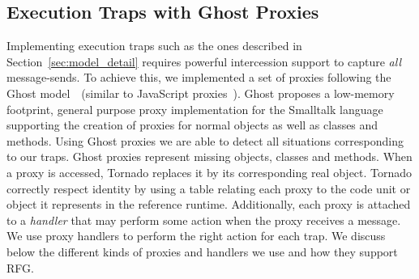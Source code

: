 \subsection{Execution Traps with Ghost Proxies} \label{sec:proxies}

Implementing execution traps such as the ones described in Section~\ref{sec:model_detail} requires powerful intercession support to capture \emph{all} message-sends.%
To achieve this, we implemented a set of proxies following the Ghost model~\cite{Mart11a}~(similar to JavaScript proxies~\cite{Vanc10a}). Ghost proposes a low-memory footprint, general purpose proxy implementation for the Smalltalk language supporting the creation of proxies for normal objects as well as classes and methods. 
Using Ghost proxies we are able to detect all situations corresponding to our traps.
Ghost proxies represent missing objects, classes and methods. When a proxy is accessed, Tornado replaces it by its corresponding real object.
Tornado correctly respect identity by using a table relating each proxy to the code unit or object it represents in the reference runtime.
Additionally, each proxy is attached to a \emph{handler} that may perform some action when the proxy receives a message.
We use proxy handlers to perform the right action for each trap.
We discuss below the different kinds of proxies and handlers we use and how they support RFG.

